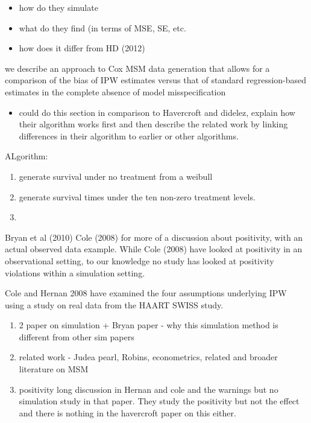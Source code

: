\documentclass[11pt]{article}
\providecommand{\tightlist}{%
      \setlength{\itemsep}{0pt}\setlength{\parskip}{0pt}}
\begin{document}
\begin{itemize}
\item
  how do they simulate
\item
  what do they find (in terms of MSE, SE, etc.
\item
  how does it differ from HD (2012)
\end{itemize}

we describe an approach to Cox MSM data generation that allows for a
comparison of the bias of IPW estimates versus that of standard
regression-based estimates in the complete absence of model
misspecification

\begin{itemize}
\tightlist
\item
  could do this section in comparison to Havercroft and didelez, explain
  how their algorithm works first and then describe the related work by
  linking differences in their algorithm to earlier or other algorithms.
\end{itemize}

ALgorithm:

\begin{enumerate}
\def\labelenumi{\arabic{enumi}.}
\item
  generate survival under no treatment from a weibull
\item
  generate survival times under the ten non-zero treatment levels.
\item
\end{enumerate}

Bryan et al (2010) Cole (2008) for more of a discussion about
positivity, with an actual observed data example. While Cole (2008) have
looked at positivity in an observational setting, to our knowledge no
study has looked at positivity violations within a simulation setting.

Cole and Hernan 2008 have examined the four assumptions underlying IPW
using a study on real data from the HAART SWISS study.

\begin{enumerate}
\def\labelenumi{\arabic{enumi}.}
\tightlist
\item
  2 paper on simulation + Bryan paper - why this simulation method is
  different from other sim papers
\item
  related work - Judea pearl, Robins, econometrics, related and broader
  literature on MSM
\item
  positivity long discussion in Hernan and cole and the warnings but no
  simulation study in that paper. They study the positivity but not the
  effect and there is nothing in the havercroft paper on this either.
\end{enumerate}
\end{document}
